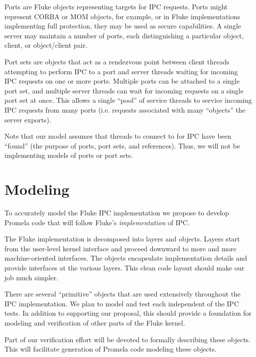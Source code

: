 \documentclass{article}
\begin{document}
Ports are Fluke objects representing targets for IPC requests.
Ports might represent CORBA or MOM objects, for example,
or in Fluke implementations implementing full protection,
they may be used as secure capabilities.
A single server may maintain a number of ports,
each distinguishing a particular object, client,
or object/client pair.

Port sets are objects that act as a rendezvous point
between client threads attempting to perform IPC to a port
and server threads waiting for incoming IPC requests on one or more ports.
Multiple ports can be attached to a single port set,
and multiple server threads can wait for incoming requests
on a single port set at once.
This allows a single ``pool'' of service threads
to service incoming IPC requests from many ports
(i.e. requests associated with many ``objects'' the server exports).

Note that our model assumes that threads to connect to for IPC
have been ``found'' (the purpose of ports, port sets, and references).
Thus, we will not be implementing models of ports or port sets.

\section*{Modeling}

To accurately model the Fluke IPC implementation we propose
to develop Promela code that will follow Fluke's {\em implementation}
of IPC. 

The Fluke implementation is decomposed into layers and
objects.  Layers start from the user-level kernel interface and
proceed downward to more and more machine-oriented interfaces.
The objects encapsulate implementation details and provide
interfaces at the various layers.  This clean code layout
should make our job much simpler.

There are several ``primitive'' objects that are used
extensively throughout the IPC implementation.  
We plan to model and test each independent of the IPC
tests.  In addition to supporting our proposal,
this should provide a foundation for
modeling and verification of other parts of the Fluke kernel.

Part of our verification effort will be devoted to
formally describing these objects.   
This will facilitate generation of Promela code
modeling these objects.

\end{document}

